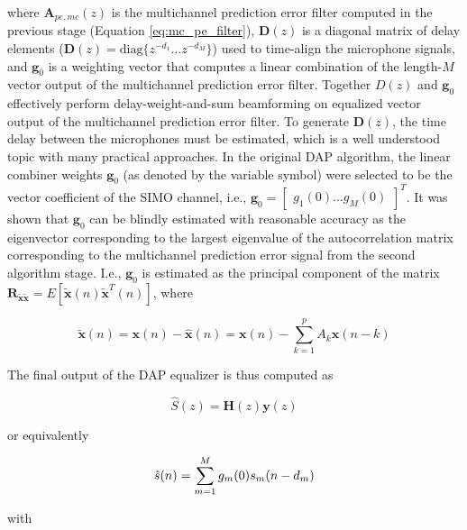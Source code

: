 \noindent
where $\boldsymbol{A}_{pe,mc}(z)$ is the multichannel prediction error filter computed in the previous stage (Equation \ref{eq:mc_pe_filter}), $\boldsymbol{D}(z)$ is a diagonal matrix of delay elements ($\boldsymbol{D}(z) = \mathrm{diag} \{z^{-d_1} \dots z^{-d_M}\}$) used to time-align the microphone signals, and $\boldsymbol{g}_0$ is a weighting vector that computes a linear combination of the length-$M$ vector output of the multichannel prediction error filter. Together $D(z)$ and $\boldsymbol{g}_0$ effectively perform delay-weight-and-sum beamforming on equalized vector output of the multichannel prediction error filter. To generate $\boldsymbol{D}(z)$, the time delay between the microphones must be estimated, which is a well understood topic with many practical approaches. In the original DAP algorithm, the linear combiner weights $\boldsymbol{g}_0$ (as denoted by the variable symbol) were selected to be the vector coefficient of the SIMO channel, i.e., $\boldsymbol{g}_0 = \begin{bmatrix} g_1(0) \dots g_M(0) \end{bmatrix} ^T$. It was shown that $\boldsymbol{g}_0$ can be blindly estimated with reasonable accuracy as the eigenvector corresponding to the largest eigenvalue of the autocorrelation matrix corresponding to the multichannel prediction error signal from the second algorithm stage. I.e., $\boldsymbol{g}_0$ is estimated as the principal component of the matrix $\boldsymbol{R}_{\tilde{\boldsymbol{x}} \tilde{\boldsymbol{x}}} = E[ \tilde{\boldsymbol{x}}(n) \tilde{\boldsymbol{x}}^T(n) ]$, where

\begin{equation}
	\tilde{\boldsymbol{x}}(n) = \boldsymbol{x}(n) - \hat{\boldsymbol{x}}(n) = \boldsymbol{x}(n) - \sum_{k=1}^{p} A_k \boldsymbol{x}(n-k)
\end{equation}

The final output of the DAP equalizer is thus computed as 

\begin{equation}
	\hat{S}(z) = \boldsymbol{H}(z) \boldsymbol{y}(z) 
\end{equation}

\noindent
or equivalently

\begin{equation}
	\hat{s}(n) = \sum_{m=1}^{M} g_m(0) s_m(n-d_m) \\
\end{equation}

\noindent 
with

